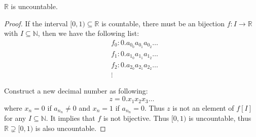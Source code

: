 \begin{proposition}
    $\mathbb R$ is uncountable.
    
    \begin{proof}
        If the interval $[0,1) \subseteq \mathbb R$ is countable, there must be an bijection $f: I \to \mathbb R$ with $I \subseteq \mathbb N$, then we have the following list:
        $$
        \begin{aligned}
            & f_0: 0.a_{0_0} a_{0_1} a_{0_2} \ldots \\
            & f_1: 0.a_{1_0} a_{1_1} a_{1_2} \ldots \\
            & f_2: 0.a_{2_0} a_{2_1} a_{2_2} \ldots \\
            & \vdots
        \end{aligned}
        $$
        
        Construct a new decimal number as following:
        $$
        z = 0.x_1 x_2 x_3 \ldots
        $$
        where $x_n = 0$ if $a_{n_n} \ne 0$ and $x_n = 1$ if $a_{n_n} = 0$. Thus $z$ is not an element of $f[I]$ for any $I \subseteq \mathbb N$. It implies that $f$ is not bijective. Thus $[0,1)$ is uncountable, thus $\mathbb R \supsetneq [0,1)$ is also uncountable.
    \end{proof}
\end{proposition}






































%